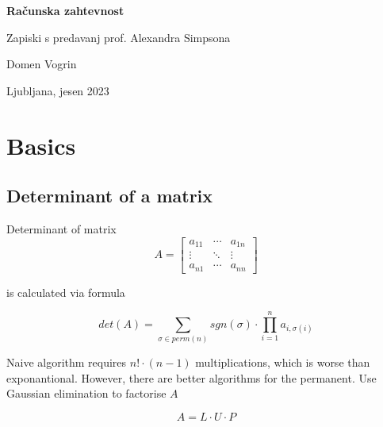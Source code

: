 \documentclass[a4paper,12pt]{article}
\theoremstyle{definition}
\theoremstyle{remark}
\begin{document}
\begin{titlepage}
    \begin{center}
        
        \vspace*{3cm}
            
        \Huge
        \textbf{Računska zahtevnost}

        \large
        Zapiski s predavanj prof. Alexandra Simpsona

        \vspace*{0.5cm}
        \LARGE
        Domen Vogrin

        \vfill
        \normalsize
        Ljubljana, jesen 2023
    \end{center}

\end{titlepage}

\clearpage

\tableofcontents
\newpage
{}


\section{Basics}
\subsection{Determinant of a matrix}
Determinant of matrix
\begin{equation*}
    A = \begin{bmatrix}
        a_{11} & \cdots & a_{1n} \\
        \vdots & \ddots & \vdots \\
        a_{n1} & \cdots & a_{nn}
    \end{bmatrix}
\end{equation*}

is calculated via formula

\begin{equation*}
    det(A) = \sum_{\sigma \in perm(n)} sgn(\sigma) \cdot \prod_{i = 1}^{n} a_{i, \sigma(i)}
\end{equation*}

Naive algorithm requires $n! \cdot (n-1)$ multiplications, which is worse than exponantional. However, there are better algorithms for the permanent.
Use Gaussian elimination to factorise $A$

\begin{equation*}
    A = L \cdot U \cdot P
\end{equation*}
\end{document}
